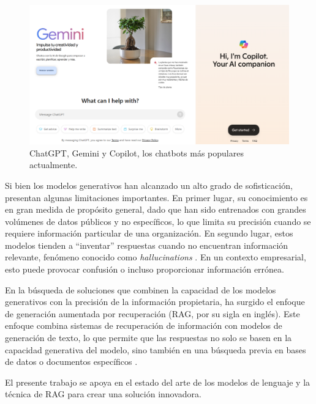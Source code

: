 \vspace{25mm}

\begin{figure}[ht]
	\centering
	\includegraphics[scale=.38]{./Figures/chatbots.png}
	\caption{ChatGPT, Gemini y Copilot, los chatbots más populares actualmente.}
	\label{fig:chatbots}
\end{figure}

\vspace{10mm}

Si bien los modelos generativos han alcanzado un alto grado de sofisticación, presentan algunas limitaciones importantes. 
En primer lugar, su conocimiento es en gran medida de propósito general, dado que han sido entrenados con grandes volúmenes 
de datos públicos y no específicos, lo que limita su precisión cuando se requiere información particular de una organización. 
En segundo lugar, estos modelos tienden a ``inventar'' respuestas cuando no encuentran información relevante, fenómeno conocido 
como \textit{hallucinations} \citep{article:hallucinations}. En un contexto empresarial, esto puede provocar confusión o incluso 
proporcionar información errónea.

En la búsqueda de soluciones que combinen la capacidad de los modelos generativos con la precisión de la información propietaria, 
ha surgido el enfoque de generación aumentada por recuperación (RAG, por su sigla en inglés). Este enfoque combina sistemas de 
recuperación de información con modelos de generación de texto, lo que permite que las respuestas no solo se basen en la capacidad 
generativa del modelo, sino también en una búsqueda previa en bases de datos o documentos específicos \citep{paper:rag-1} 
\citep{paper:rag-2}.

El presente trabajo se apoya en el estado del arte de los modelos de lenguaje y la técnica de RAG para crear una solución innovadora.

